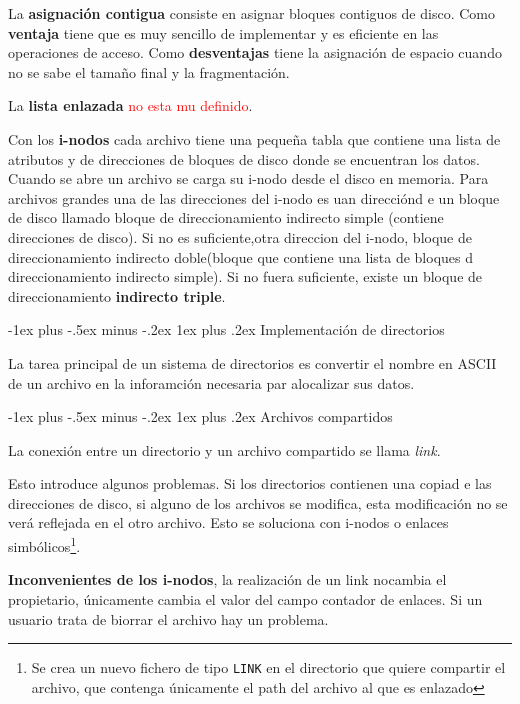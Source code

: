 \documentclass[10pt,portrait, twocolumn]{article}
\makeatletter
\renewcommand{\subsubsection}{\@startsection{subsubsection}{3}{0mm}%
                                {-1ex plus -.5ex minus -.2ex}%
                                {1ex plus .2ex}%
                                {\normalfont\small\bfseries}}
\makeatother
\begin{document}
La \textbf{asignación contigua} consiste en asignar bloques contiguos de disco. Como \textbf{ventaja} tiene que es muy sencillo de implementar y es eficiente en las operaciones de acceso. Como \textbf{desventajas} tiene la asignación de espacio cuando no se sabe el tamaño final y la fragmentación.

	\quad La \textbf{lista enlazada} \textcolor{red}{no esta mu definido}.
	
	\quad Con los \textbf{i-nodos} cada archivo tiene una pequeña tabla que contiene una lista de atributos y de direcciones de bloques de disco donde se encuentran los datos. Cuando se abre un archivo se carga su i-nodo desde el disco en memoria. Para archivos grandes una de las direcciones del i-nodo es uan direcciónd e un bloque de disco llamado bloque de direccionamiento indirecto simple (contiene direcciones de disco). Si no es suficiente,otra direccion del i-nodo, bloque de direccionamiento indirecto doble(bloque que contiene una lista de bloques d direccionamiento indirecto simple). Si no fuera suficiente, existe un bloque de direccionamiento \textbf{indirecto triple}.
	
\subsubsection{Implementación de directorios}

La tarea principal de un sistema de directorios es convertir el nombre en ASCII de un archivo en la inforamción necesaria par alocalizar sus datos.

\subsubsection{Archivos compartidos}

La conexión entre un directorio y un archivo compartido se llama \textit{link}. 

	\quad Esto introduce algunos problemas. Si los directorios contienen una copiad e las direcciones de disco, si alguno de los archivos se modifica, esta modificación no se verá reflejada en el otro archivo. Esto se soluciona con i-nodos o enlaces simbólicos\footnote{Se crea un nuevo fichero de tipo \texttt{LINK} en el directorio que quiere compartir el archivo, que contenga únicamente el path del archivo al que es enlazado}.
	
	\quad \textbf{Inconvenientes de los i-nodos}, la realización de un link nocambia el propietario, únicamente cambia el valor del campo contador de enlaces. Si un usuario trata de biorrar el archivo hay un problema.
	
\end{document}
